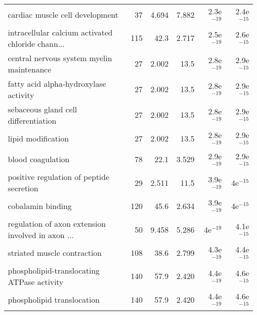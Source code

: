 \begin{longtable}{lrrrrr}
                   cardiac muscle cell development &                      37 &                   4.694 &      7.882 &         2.3e$^{-19}$ &         2.4e$^{-15}$ \\
 intracellular calcium activated chloride chann... &                     115 &                    42.3 &      2.717 &         2.5e$^{-19}$ &         2.6e$^{-15}$ \\
         central nervous system myelin maintenance &                      27 &                   2.002 &       13.5 &         2.8e$^{-19}$ &         2.9e$^{-15}$ \\
             fatty acid alpha-hydroxylase activity &                      27 &                   2.002 &       13.5 &         2.8e$^{-19}$ &         2.9e$^{-15}$ \\
              sebaceous gland cell differentiation &                      27 &                   2.002 &       13.5 &         2.8e$^{-19}$ &         2.9e$^{-15}$ \\
                                lipid modification &                      27 &                   2.002 &       13.5 &         2.8e$^{-19}$ &         2.9e$^{-15}$ \\
                                 blood coagulation &                      78 &                    22.1 &      3.529 &         2.9e$^{-19}$ &         2.9e$^{-15}$ \\
          positive regulation of peptide secretion &                      29 &                   2.511 &       11.5 &         3.9e$^{-19}$ &           4e$^{-15}$ \\
                                 cobalamin binding &                     120 &                    45.6 &      2.634 &         3.9e$^{-19}$ &           4e$^{-15}$ \\
 regulation of axon extension involved in axon ... &                      50 &                   9.458 &      5.286 &           4e$^{-19}$ &         4.1e$^{-15}$ \\
                       striated muscle contraction &                     108 &                    38.6 &      2.799 &         4.3e$^{-19}$ &         4.4e$^{-15}$ \\
        phospholipid-translocating ATPase activity &                     140 &                    57.9 &      2.420 &         4.4e$^{-19}$ &         4.6e$^{-15}$ \\
                        phospholipid translocation &                     140 &                    57.9 &      2.420 &         4.4e$^{-19}$ &         4.6e$^{-15}$ \\

\end{longtable}
